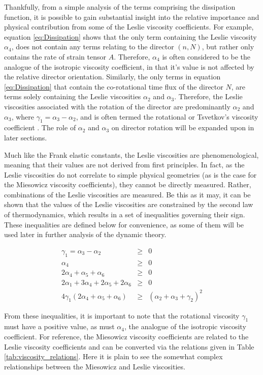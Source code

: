 Thankfully, from a simple analysis of the terms comprising the dissipation function, it is possible to gain substantial insight into the relative importance and physical contribution from some of the Leslie viscosity coefficients. For example, equation \ref{eq:Dissipation} shows that the only term containing the Leslie viscosity $\alpha_4$, does not contain any terms relating to the director $\left(n,N\right)$, but rather only contains the rate of strain tensor $A$. Therefore, $\alpha_4$ is often considered to be the analogue of the isotropic viscosity coefficient, in that it's value is not affected by the relative director orientation. Similarly, the only terms in equation \ref{eq:Dissipation} that contain the co-rotational time flux of the director $N$, are terms solely containing the Leslie viscosities $\alpha_2$ and $\alpha_3$. Therefore, the Leslie viscosities associated with the rotation of the director are predominantly $\alpha_2$ and $\alpha_3$, where $\gamma_1=\alpha_3-\alpha_2$, and is often termed the rotational or Tsvetkov's viscosity coefficient \cite{Belyaev2001}. The role of $\alpha_2$ and $\alpha_3$ on director rotation will be expanded upon in later sections.

Much like the Frank elastic constants, the Leslie viscosities are phenomenological, meaning that their values are not derived from first principles. In fact, as the Leslie viscosities do not correlate to simple physical geometries (as is the case for the Miesowicz viscosity coefficients), they cannot be directly measured. Rather, combinations of the Leslie viscosities are measured. Be this as it may, it can be shown that the values of the Leslie viscosities are constrained by the second law of thermodynamics, which results in a set of inequalities governing their sign. These inequalities \cite{Stewart2004} are defined below for convenience, as some of them will be used later in further analysis of the dynamic theory.

\begin{eqnarray}
\gamma_1=\alpha_3-\alpha_2&\geq&0\\
\alpha_4&\geq&0\\
2\alpha_4+\alpha_5+\alpha_6&\geq&0\\
2\alpha_1+3\alpha_4+2\alpha_5+2\alpha_6&\geq&0\\
4\gamma_1\left(2\alpha_4+\alpha_5+\alpha_6\right)&\geq&\left(\alpha_2+\alpha_3+\gamma_2\right)^2
\end{eqnarray}

\noindent From these inequalities, it is important to note that the rotational viscosity $\gamma_1$ must have a positive value, as must $\alpha_4$, the analogue of the isotropic viscosity coefficient. For reference, the Miesowicz viscosity coefficients are related to the Leslie viscosity coefficients and can be converted via the relations given in Table \ref{tab:viscosity_relations}. Here it is plain to see the somewhat complex relationships between the Miesowicz and Leslie viscosities.

